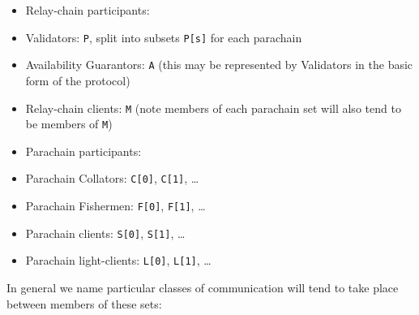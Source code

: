 \documentclass[9pt,oneside]{amsart}
\begin{document}
\begin{multicols}{2}
\begin{itemize}
\item Relay-chain participants:
\item Validators: \texttt{P}, split into subsets \texttt{P{[}s{]}} for each parachain
\item Availability Guarantors: \texttt{A} (this may be represented by Validators in the basic form of the protocol)
\item Relay-chain clients: \texttt{M} (note members of each parachain set will also tend to be members of \texttt{M})
\item Parachain participants:
\item Parachain Collators: \texttt{C{[}0{]}}, \texttt{C{[}1{]}}, \ldots{}
\item Parachain Fishermen: \texttt{F{[}0{]}}, \texttt{F{[}1{]}}, \ldots{}
\item Parachain clients: \texttt{S{[}0{]}}, \texttt{S{[}1{]}}, \ldots{}
\item Parachain light-clients: \texttt{L{[}0{]}}, \texttt{L{[}1{]}}, \ldots{}
\end{itemize}

 In general we name particular classes of communication will tend to take place between members of these sets:


\end{multicols}
\end{document}
